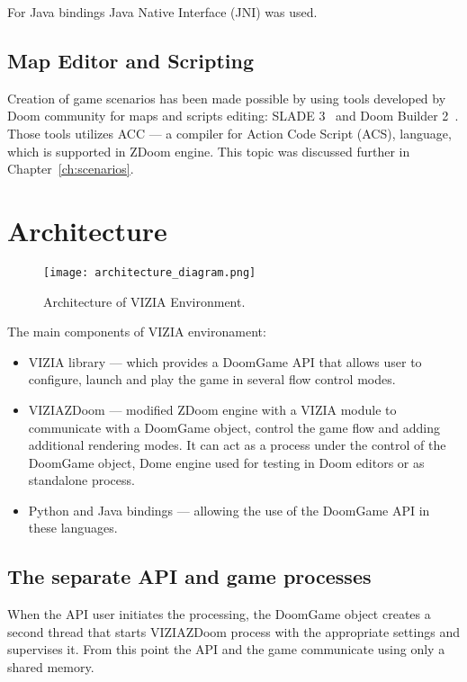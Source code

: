 For Java bindings Java Native Interface (JNI) was used.


\subsection{Map Editor and Scripting}

Creation of game scenarios has been made possible by using tools developed by Doom community for maps and scripts editing: SLADE 3~\cite{slade3} and Doom Builder 2~\cite{db2}. Those tools utilizes ACC --- a compiler for Action Code Script (ACS), language, which is supported in ZDoom engine.
This topic was discussed further in Chapter~\ref{ch:scenarios}.

\section{Architecture}\label{sec:architecture}
	\begin{figure}
			\centering
			\texttt{[image: architecture\_diagram.png]}
			\caption{Architecture of VIZIA Environment.}\label{fig:architecture_diagram}
	\end{figure}

The main components of VIZIA environament:
    \begin{itemize}
    \item VIZIA library --- which provides a DoomGame API that allows user to configure, launch and play the game in several flow control modes.
    \item VIZIAZDoom --- modified ZDoom engine with a VIZIA module to communicate with a DoomGame object, control the game flow and adding additional rendering modes. It can act as a process under the control of the DoomGame object, Dome engine used for testing in Doom editors or as standalone process.
    \item Python and Java bindings --- allowing the use of the DoomGame API in these languages.
    \end{itemize}


\subsection{The separate API and game processes}\label{sec:architecture_separate_processes}

When the API user initiates the processing, the DoomGame object creates a second thread that starts VIZIAZDoom process with the appropriate settings and supervises it. From this point the API and the game communicate using only a shared memory.


